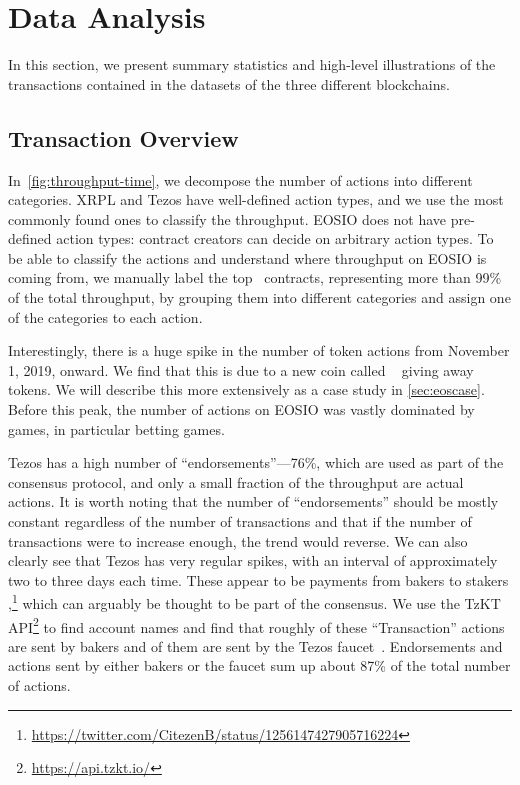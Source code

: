 \section{Data Analysis}
\label{sec:4:data-analysis}
In this section, we present summary statistics and high-level illustrations of the transactions contained in the datasets of the three different blockchains.

\subsection{Transaction Overview}


In~\autoref{fig:throughput-time}, we decompose the number of actions into different categories. XRPL and Tezos have well-defined action types, and we use the most commonly found ones to classify the throughput.
EOSIO does not have pre-defined action types: contract creators can decide on arbitrary action types.
To be able to classify the actions and understand where throughput on EOSIO is coming from, we manually label the top~ contracts, representing more than 99\% of the total throughput, by grouping them into different categories and assign one of the categories to each action.

Interestingly, there is a huge spike in the number of token actions from November 1, 2019, onward. 
We find that this is due to a new coin called ~\cite{Enumivo2019} giving away tokens. 
We will describe this more extensively as a case study in \autoref{sec:eoscase}. 
Before this peak, the number of actions on EOSIO was vastly dominated by games, in particular betting games.

Tezos has a high number of ``endorsements''---76\%, which are used as part of the consensus protocol, and only a small fraction of the throughput are actual actions.
It is worth noting that the number of ``endorsements'' should be mostly constant regardless of the number of transactions and that if the number of transactions were to increase enough, the trend would reverse.
We can also clearly see that Tezos has very regular spikes, with an interval of approximately two to three days each time.
These appear to be payments from bakers to stakers \cite{cryptium-labs-payout},\footnote{\url{https://twitter.com/CitezenB/status/1256147427905716224}} which can arguably be thought to be part of the consensus.
We use the TzKT API\footnote{\url{https://api.tzkt.io/}} to find account names and find that roughly  of these ``Transaction'' actions are sent by bakers and  of them are sent by the Tezos faucet~\cite{tezos-faucet}.
Endorsements and actions sent by either bakers or the faucet sum up about 87\% of the total number of actions.

